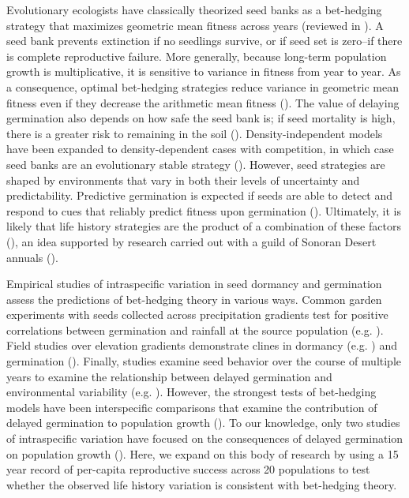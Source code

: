 \documentclass[12pt, oneside, titlepage]{article}   	%
\begin{document}
Evolutionary ecologists have classically theorized seed banks as a bet-hedging strategy that maximizes geometric mean fitness across years (reviewed in \cite{philippi1989,simons2011}). A seed bank prevents extinction if no seedlings survive, or if seed set is zero--if there is complete reproductive failure. More generally, because long-term population growth is multiplicative, it is sensitive to variance in fitness from year to year. As a consequence, optimal bet-hedging strategies reduce variance in geometric mean fitness even if they decrease the arithmetic mean fitness (\cite{cohen1966}). The value of delaying germination also depends on how safe the seed bank is; if seed mortality is high, there is a greater risk to remaining in the soil (\cite{cohen1966}). Density-independent models have been expanded to density-dependent cases with competition, in which case seed banks are an evolutionary stable strategy (\cite{ellner1985,ellner1985a}). However, seed strategies are shaped by environments that vary in both their levels of uncertainty and predictability. Predictive germination is expected if seeds are able to detect and respond to cues that reliably predict fitness upon germination (\cite{cohen1967}). Ultimately, it is likely that life history strategies are the product of a combination of these factors (\cite{simons2011}), an idea supported by research carried out with a guild of Sonoran Desert annuals (\cite{venable2007,gremer2014,gremer2016}).

Empirical studies of intraspecific variation in seed dormancy and germination assess the predictions of bet-hedging theory in various ways. Common garden experiments with seeds collected across precipitation gradients test for positive correlations between germination and rainfall at the source population (e.g. \cite{hacker1984,hacker1989,philippi1993a,clauss2000}). Field studies over elevation gradients demonstrate clines in dormancy (e.g. \cite{fernandez-pascual2013}) and germination (\cite{gremer2020}). Finally, studies examine seed behavior over the course of multiple years to examine the relationship between delayed germination and environmental variability (e.g. \cite{philippi1993,evans2007}). However, the strongest tests of bet-hedging models have been interspecific comparisons that examine the contribution of delayed germination to population growth (\cite{venable2007,gremer2014,gremer2016}). To our knowledge, only two studies of intraspecific variation have focused on the consequences of delayed germination on population growth (\cite{clauss1999a,evans2007}). Here, we expand on this body of research by using a 15 year record of per-capita reproductive success across 20 populations to test whether the observed life history variation is consistent with bet-hedging theory. 
 
\end{document}
